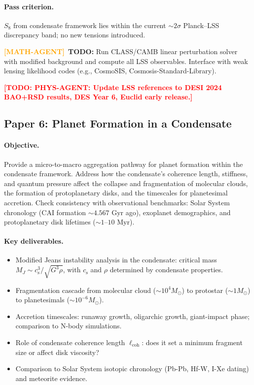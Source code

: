 \documentclass[11pt,a4paper]{article}
\newcommand{\cs}{c_{\mathrm{s}}}
\theoremstyle{definition}
\newcommand{\TODO}[1]{\textcolor{red}{\textbf{[TODO: #1]}}}
\newcommand{\MATHAGENT}{\textcolor{orange}{\textbf{[MATH-AGENT]}}}
\begin{document}
\paragraph{Pass criterion.}
$S_8$ from condensate framework lies within the current $\sim 2\sigma$ Planck--LSS discrepancy band; no new tensions introduced.

\MATHAGENT~\textbf{TODO:} Run CLASS/CAMB linear perturbation solver with modified background and compute all LSS observables. Interface with weak lensing likelihood codes (e.g., CosmoSIS, Cosmosis-Standard-Library).

\TODO{PHYS-AGENT: Update LSS references to DESI 2024 BAO+RSD results, DES Year 6, Euclid early release.}

\subsection{Paper 6: Planet Formation in a Condensate}
\label{sec:paper6}

\paragraph{Objective.}
Provide a micro-to-macro aggregation pathway for planet formation within the condensate framework. Address how the condensate's coherence length, stiffness, and quantum pressure affect the collapse and fragmentation of molecular clouds, the formation of protoplanetary disks, and the timescales for planetesimal accretion. Check consistency with observational benchmarks: Solar System chronology (CAI formation $\sim 4.567$ Gyr ago), exoplanet demographics, and protoplanetary disk lifetimes ($\sim 1$--$10$ Myr).

\paragraph{Key deliverables.}
\begin{itemize}[leftmargin=1.8em]
  \item Modified Jeans instability analysis in the condensate: critical mass $M_J \sim \cs^3 / \sqrt{G^3 \rho}$, with $\cs$ and $\rho$ determined by condensate properties.
  \item Fragmentation cascade from molecular cloud ($\sim 10^4 M_\odot$) to protostar ($\sim 1 M_\odot$) to planetesimals ($\sim 10^{-6} M_\odot$).
  \item Accretion timescales: runaway growth, oligarchic growth, giant-impact phase; comparison to N-body simulations.
  \item Role of condensate coherence length $\ell_{\mathrm{coh}}$: does it set a minimum fragment size or affect disk viscosity?
  \item Comparison to Solar System isotopic chronology (Pb-Pb, Hf-W, I-Xe dating) and meteorite evidence.
\end{itemize}
\end{document}
